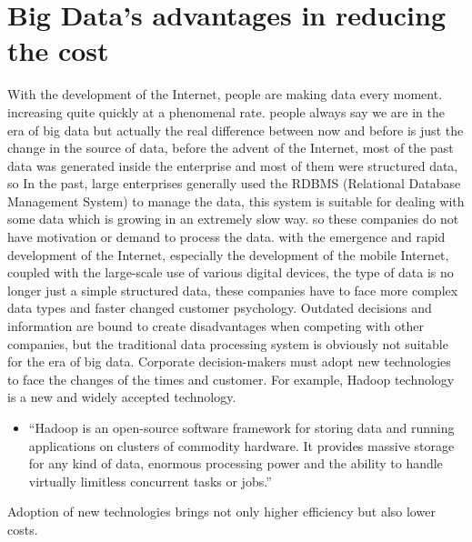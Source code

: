 \documentclass[sigconf]{acmart}
\begin{document}
\section{Big Data's advantages in reducing the cost}
With the development of the Internet, people are making data every moment. increasing quite quickly at a phenomenal rate. people always say we are in the era of big data but actually the real difference between now and before is just the change in the source of data, before the advent of the Internet, most of the past data was generated inside the enterprise and most of them were structured data, so In the past, large enterprises generally used the RDBMS (Relational Database Management System) to manage the data, this system is suitable for dealing with some data which is growing in an extremely slow way. so these companies do not have motivation or demand to process the data. with the emergence and rapid development of the Internet, especially the development of the mobile Internet, coupled with the large-scale use of various digital devices, the type of data is no longer just a simple structured data, these companies have to face more complex data types and faster changed customer psychology. Outdated decisions and information are bound to create disadvantages when competing with other companies, but the traditional data processing system is obviously not suitable for the era of big data. Corporate decision-makers must adopt new technologies to face the changes of the times and customer. For example, Hadoop technology is a new and widely accepted technology.
\begin{itemize}

  \item ``Hadoop is an open-source software framework for storing data and running applications on clusters of commodity hardware. It provides massive storage for any kind of data, enormous processing power and the ability to handle virtually limitless concurrent tasks or jobs.''
\end{itemize}
Adoption of new technologies brings not only higher efficiency but also lower costs.
\end{document}
